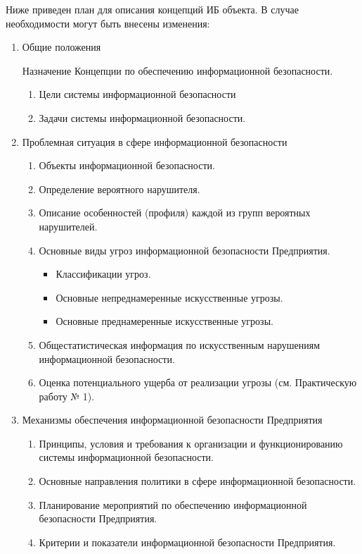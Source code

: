 Ниже приведен план для описания концепций ИБ объекта. В случае необходимости
могут быть внесены изменения:
\begin{enumerate}
	\item Общие положения

	Назначение Концепции по обеспечению информационной безопасности.
	\begin{enumerate}
	  \item Цели системы информационной безопасности
	  \item Задачи системы информационной безопасности.
	\end{enumerate}

	\item Проблемная ситуация в сфере информационной безопасности
	\begin{enumerate}
		\item Объекты информационной безопасности.
		\item Определение вероятного нарушителя.
		\item Описание особенностей (профиля) каждой из групп вероятных нарушителей.
		\item Основные виды угроз информационной безопасности Предприятия.
		\begin{itemize}
			\item Классификации угроз.
			\item Основные непреднамеренные искусственные угрозы.
			\item Основные преднамеренные искусственные угрозы.
		\end{itemize}
		
		\item Общестатистическая информация по искусственным нарушениям информационной безопасности.
		\item Оценка потенциального ущерба от реализации угрозы (см. Практическую работу № 1).
	\end{enumerate}
	
	\item Механизмы обеспечения информационной безопасности  Предприятия
	\begin{enumerate}
		\item Принципы, условия и требования к организации и функционированию системы информационной безопасности.
		\item Основные направления политики в сфере информационной безопасности.
		\item Планирование мероприятий по обеспечению информационной безопасности Предприятия.
		\item Критерии и показатели информационной безопасности Предприятия.
	\end{enumerate}
	

\end{enumerate}
